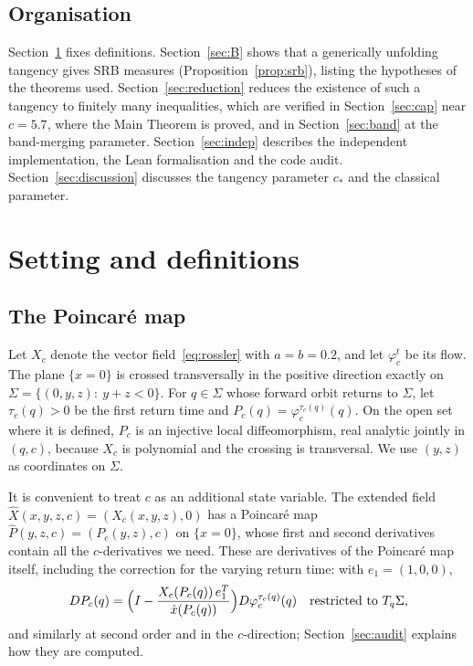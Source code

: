 \documentclass[11pt]{amsart}
\theoremstyle{definition}
\theoremstyle{remark}
\newcommand{\cs}{c_*}
\begin{document}
\subsection*{Organisation}
Section~\ref{sec:setting} fixes definitions. Section~\ref{sec:B} shows that a generically unfolding
tangency gives SRB measures (Proposition~\ref{prop:srb}), listing the hypotheses of the theorems used.
Section~\ref{sec:reduction} reduces the existence of such a tangency to finitely many inequalities, which
are verified in Section~\ref{sec:cap} near $c=5.7$, where the Main Theorem is proved, and in
Section~\ref{sec:band} at the band-merging parameter. Section~\ref{sec:indep} describes the independent
implementation, the Lean formalisation and the code audit. Section~\ref{sec:discussion} discusses the
tangency parameter $\cs$ and the classical parameter.

\section{Setting and definitions}\label{sec:setting}

\subsection{The Poincar\'e map}
Let $X_c$ denote the vector field~\eqref{eq:rossler} with $a=b=0.2$, and let $\varphi^t_c$ be its flow.
The plane $\{x=0\}$ is crossed transversally in the positive direction exactly on
$\Sigma=\{(0,y,z):\ y+z<0\}$. For $q\in\Sigma$ whose forward orbit returns to $\Sigma$, let
$\tau_c(q)>0$ be the first return time and $P_c(q)=\varphi_c^{\tau_c(q)}(q)$. On the open set where it is
defined, $P_c$ is an injective local diffeomorphism, real analytic jointly in $(q,c)$, because $X_c$ is
polynomial and the crossing is transversal. We use $(y,z)$ as coordinates on $\Sigma$.

It is convenient to treat $c$ as an additional state variable. The extended field
$\hat X(x,y,z,c)=(X_c(x,y,z),0)$ has a Poincar\'e map $\hat P(y,z,c)=(P_c(y,z),c)$ on $\{x=0\}$, whose first
and second derivatives contain all the $c$-derivatives we need. These are derivatives of the Poincar\'e
map itself, including the correction for the varying return time: with $e_1=(1,0,0)$,
\[
DP_c(q)=\Bigl(I-\frac{X_c(P_c(q))\,e_1^T}{\dot x(P_c(q))}\Bigr)D\varphi_c^{\tau_c(q)}(q)
\quad\text{restricted to } T_q\Sigma,
\]
and similarly at second order and in the $c$-direction; Section~\ref{sec:audit} explains how they are
computed.
\end{document}
